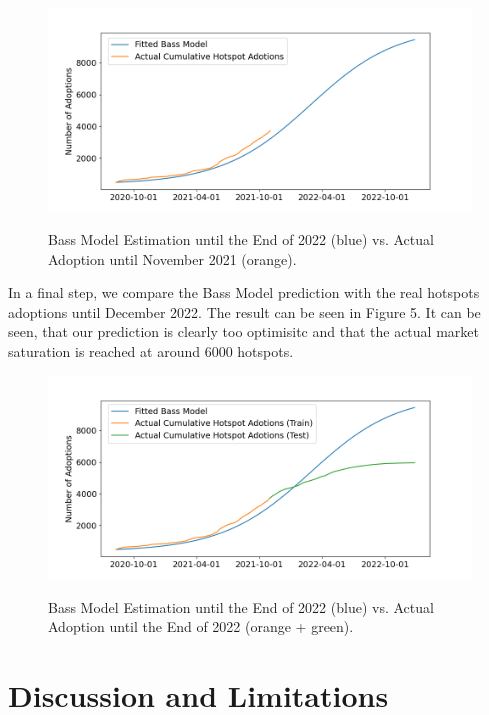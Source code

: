 \documentclass{article}
\begin{document}
\begin{figure}[!hptb]
    \centering{}\includegraphics[scale=0.6]{plots/cumulative_bass_model_adoptions_vs_actual_cumulative_adoptions.png}\\
    \caption{Bass Model Estimation until the End of 2022 (blue) vs. Actual Adoption until November 2021 (orange).}
\end{figure}

\noindent In a final step, we compare the Bass Model prediction with the real hotspots adoptions until December 2022. The result can be seen in Figure 5. It can be seen, that our
prediction is clearly too optimisitc and that the actual market saturation is reached at around $6000$ hotspots.

\begin{figure}[!hptb]
    \centering{}\includegraphics[scale=0.6]{plots/predicted_cumulative_weekly_hotspot_adoptions.png}\\
    \caption{Bass Model Estimation until the End of 2022 (blue) vs. Actual Adoption until the End of 2022 (orange + green).}
\end{figure}


\section{Discussion and Limitations}
\end{document}
